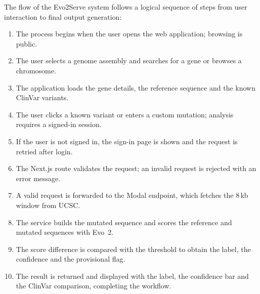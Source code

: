 \begin{figure}[!tb]\centering\setlength{\diagH}{0.82\textheight}\diagFlow\par\vspace{6pt}\label{fig:5.1}\end{figure}
The flow of the Evo2Serve system follows a logical sequence of steps from user interaction to final output generation:
\begin{enumerate}
\item The process begins when the user opens the web application; browsing is public.
\item The user selects a genome assembly and searches for a gene or browses a chromosome.
\item The application loads the gene details, the reference sequence and the known ClinVar variants.
\item The user clicks a known variant or enters a custom mutation; analysis requires a signed-in session.
\item If the user is not signed in, the sign-in page is shown and the request is retried after login.
\item The Next.js route validates the request; an invalid request is rejected with an error message.
\item A valid request is forwarded to the Modal endpoint, which fetches the 8\,kb window from UCSC.
\item The service builds the mutated sequence and scores the reference and mutated sequences with Evo~2.
\item The score difference is compared with the threshold to obtain the label, the confidence and the provisional flag.
\item The result is returned and displayed with the label, the confidence bar and the ClinVar comparison, completing the workflow.
\end{enumerate}


